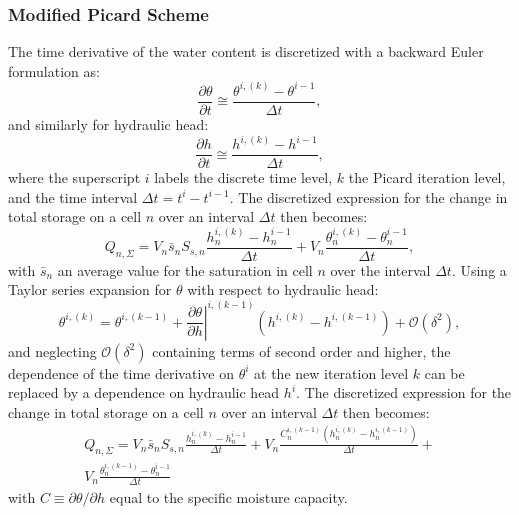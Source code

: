 \documentclass[fleqn]{article}
\begin{document}
\subsubsection*{Modified Picard Scheme}
The time derivative of the water content is discretized
with a backward Euler formulation as:
\begin{equation}
  \frac{\partial \theta}{\partial t} \cong
  \frac{\theta^{i,(k)} - \theta^{i-1}}{\Delta t},
  \label{eq-dtheta-dt}
\end{equation}
and similarly for hydraulic head:
\begin{equation}
  \frac{\partial h}{\partial t} \cong
  \frac{h^{i,(k)} - h^{i-1}}{\Delta t},
\end{equation}
where the superscript $i$ labels the discrete time level,
$k$ the Picard iteration level, and the time interval
$\Delta t = t^{i} - t^{i-1}$. The discretized expression 
for the change in total storage on a cell $n$ over an 
interval $\Delta t$ then becomes:
\begin{equation}
  Q_{n,\Sigma} =
  V_n \bar{s}_n S_{s,n}
  \frac{h_n^{i,(k)} - h_n^{i-1}}{\Delta t} +
  V_n \frac{\theta_n^{i,(k)} - \theta_n^{i-1}}{\Delta t},
  \label{eq-sto-discrete}
\end{equation}
with $\bar{s}_n$ an average value for the saturation in
cell $n$ over the interval $\Delta t$. Using a Taylor series 
expansion for $\theta$ with respect to hydraulic head:
\begin{equation}
  \theta^{i,(k)} = \theta^{i,(k-1)} + 
  \left. \frac{\partial \theta}{\partial h} \right|^{i,(k-1)}
  \left( h^{i,(k)} - h^{i,(k-1)} \right) + \mathcal{O} (\delta^2),
\end{equation}
and neglecting $\mathcal{O}(\delta^2)$ containing terms of second
order and higher, the dependence of the time derivative on $\theta^i$
at the new iteration level $k$ can be replaced by a dependence on
hydraulic head $h^i$. The discretized expression for the change in
total storage on a cell $n$ over an interval $\Delta t$ then becomes:
\begin{equation}
  \begin{split}
    Q_{n,\Sigma} =
    V_n \bar{s}_n S_{s,n}
    \frac{h_n^{i,(k)} - h_n^{i-1}}{\Delta t} +
    V_n \frac{C_n^{i,(k-1)}(h_n^{i,(k)} - h_n^{i,(k-1)})}{\Delta t} + \\
    V_n \frac{\theta_n^{i,(k-1)} - \theta_n^{i-1}}{\Delta t}  
  \end{split}
  \label{eq-sto-discrete-mod}
\end{equation}
with $C \equiv \partial \theta /\partial h$ equal to the specific
moisture capacity.
\end{document}
